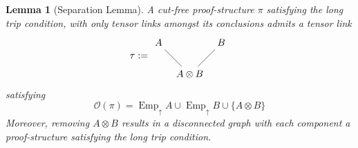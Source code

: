 \documentclass[12pt]{article}
\theoremstyle{plain}
\newtheorem{lemma}[thm]{Lemma}
\theoremstyle{definition}
\newcommand{\call}[1]{\mathcal{#1}}
\begin{document}
\begin{lemma}[Separation Lemma]
A cut-free proof-structure $\pi$ satisfying the long trip condition, with only tensor links amongst its conclusions admits a tensor link
\[
\tau := \begin{tikzcd}[column sep = tiny]
A\arrow[dr,dash] && B\arrow[dl,dash]\\
& A \otimes B
\end{tikzcd}
\]
satisfying
\begin{equation}
    \call{O}(\pi) = \operatorname{Emp}_{\uparrow}A \cup \operatorname{Emp}_{\uparrow}B \cup \lbrace A \otimes B\rbrace
\end{equation}
Moreover, removing $A \otimes B$ results in a disconnected graph with each component a proof-structure satisfying the long trip condition.
\end{lemma}
\end{document}
